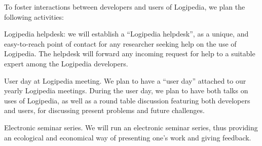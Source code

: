 \begin{workpackage}[id=dissemination,type=MGT,wphases=1-48,
  short={Dissemination},
  title={Dissemination, communication and exploitation},
  lead=Lie,LieRM=1,InrRM=6,BirRM=4,CleRM=2,ImtRM=2,StrRM=2,ZibRM=14,EduRM=12]
\begin{tasklist}
\begin{task}[id=training,
      title=Training Logipedia developers and users,
      shorttitle=Train.,
      lead=Bir,BirRM=2,wphases=1-48!.05]

  \end{task}

  \begin{task}[id=researchers-club,
      title=Expanding the use of Logipedia in research,
      shorttitle=Research,
      lead=Bir,BirRM=2,wphases=1-48!.05]
     To foster interactions between developers and users of Logipedia, we plan the following activities:
    \begin{compactitem}
     \item Logipedia helpdesk:
    we will establish a ``Logipedia helpdesk'', as a unique, and easy-to-reach point of contact for any researcher seeking help on the use of Logipedia.
     The helpdesk will forward any incoming request for help to a suitable expert among the Logipedia developers.
     \item User day at Logipedia meeting.
     We plan to have a ``user day'' attached to our yearly Logipedia meetings.
     During the user day, we plan to have both talks on uses of Logipedia, as well as a round table discussion featuring both developers and users, for discussing present problems and future challenges.
     \item Electronic seminar series.
     We will run an electronic seminar series, thus providing an ecological and economical way of presenting one's work and giving feedback.
    \end{compactitem}
  \end{task}


\end{tasklist}
\end{workpackage}
